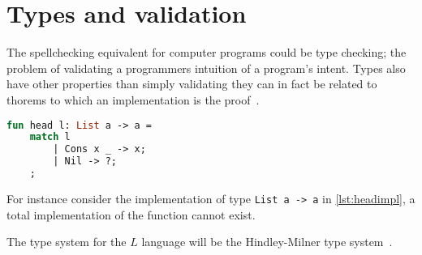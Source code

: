 \documentclass[11pt,oneside,a4paper]{report}
\begin{document}
\section{Types and validation}
The spellchecking equivalent for computer programs could be type checking; the problem of validating a programmers intuition of a program's intent.
Types also have other properties than simply validating they can in fact be related to thorems to which an implementation is the proof~\cite{howard1980formulae}.
\begin{lstlisting}[language=ML,caption={Head implementation},label={lst:headimpl}]
fun head l: List a -> a = 
    match l
        | Cons x _ -> x;
        | Nil -> ?;
    ;
\end{lstlisting}
For instance consider the implementation of type \texttt{List a -> a} in \autoref{lst:headimpl}, a total implementation of the function cannot exist.

The type system for the $L$ language will be the Hindley-Milner type system~\cite{hindley1969principal,milner1978theory}.
\end{document}
